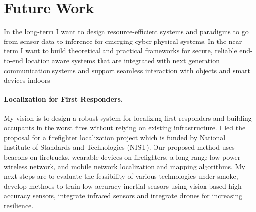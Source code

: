 \documentclass[10pt]{article}
\begin{document}
\section{Future Work}
In the long-term I want to design resource-efficient systems and paradigms to go from sensor data to inference for emerging cyber-physical systems.
In the near-term I want to build theoretical and practical frameworks for secure, reliable end-to-end location aware systems that are integrated with next generation communication systems and support seamless interaction with objects and smart devices indoors. 

\paragraph{Localization for First Responders. }
My vision is to design a robust system for localizing first responders and building occupants in the worst fires without relying on existing infrastructure. I led the proposal for a firefighter localization project which is funded by National Institute of Standards and Technologies (NIST).  %
Our proposed method uses beacons on firetrucks, wearable devices on firefighters, a long-range low-power wireless network, and mobile network localization and mapping algorithms. 
My next steps are to evaluate the feasibility of various technologies under smoke, develop methods to train low-accuracy inertial sensors using vision-based high accuracy sensors, integrate infrared sensors and integrate drones for increasing resilience. %
\end{document}

